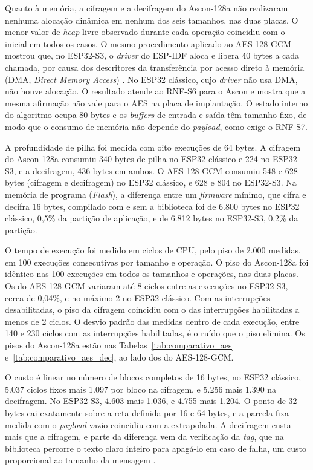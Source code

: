 Quanto à memória, a cifragem e a decifragem do Ascon-128a não realizaram nenhuma alocação dinâmica em nenhum dos seis tamanhos, nas duas placas. O menor valor de \textit{heap} livre observado durante cada operação coincidiu com o inicial em todos os casos. O mesmo procedimento aplicado ao AES-128-GCM mostrou que, no ESP32-S3, o \textit{driver} do ESP-IDF aloca e libera 40 bytes a cada chamada, por causa dos descritores da transferência por acesso direto à memória (DMA, \textit{Direct Memory Access}) \cite{espressif2026idf}. No ESP32 clássico, cujo \textit{driver} não usa DMA, não houve alocação. O resultado atende ao RNF-S6 para o Ascon e mostra que a mesma afirmação não vale para o AES na placa de implantação. O estado interno do algoritmo ocupa 80 bytes e os \textit{buffers} de entrada e saída têm tamanho fixo, de modo que o consumo de memória não depende do \textit{payload}, como exige o RNF-S7.

A profundidade de pilha foi medida com oito execuções de 64 bytes. A cifragem do Ascon-128a consumiu 340 bytes de pilha no ESP32 clássico e 224 no ESP32-S3, e a decifragem, 436 bytes em ambos. O AES-128-GCM consumiu 548 e 628 bytes (cifragem e decifragem) no ESP32 clássico, e 628 e 804 no ESP32-S3. Na memória de programa (\textit{Flash}), a diferença entre um \textit{firmware} mínimo, que cifra e decifra 16 bytes, compilado com e sem a biblioteca foi de 6.800 bytes no ESP32 clássico, 0,5\% da partição de aplicação, e de 6.812 bytes no ESP32-S3, 0,2\% da partição.

O tempo de execução foi medido em ciclos de CPU, pelo piso de 2.000 medidas, em 100 execuções consecutivas por tamanho e operação. O piso do Ascon-128a foi idêntico nas 100 execuções em todos os tamanhos e operações, nas duas placas. Os do AES-128-GCM variaram até 8 ciclos entre as execuções no ESP32-S3, cerca de 0,04\%, e no máximo 2 no ESP32 clássico. Com as interrupções desabilitadas, o piso da cifragem coincidiu com o das interrupções habilitadas a menos de 2 ciclos. O desvio padrão das medidas dentro de cada execução, entre 140 e 230 ciclos com as interrupções habilitadas, é o ruído que o piso elimina. Os pisos do Ascon-128a estão nas Tabelas~\ref{tab:comparativo_aes} e~\ref{tab:comparativo_aes_dec}, ao lado dos do AES-128-GCM.

O custo é linear no número de blocos completos de 16 bytes, no ESP32 clássico, 5.037 ciclos fixos mais 1.097 por bloco na cifragem, e 5.256 mais 1.390 na decifragem. No ESP32-S3, 4.603 mais 1.036, e 4.755 mais 1.204. O ponto de 32 bytes cai exatamente sobre a reta definida por 16 e 64 bytes, e a parcela fixa medida com o \textit{payload} vazio coincidiu com a extrapolada. A decifragem custa mais que a cifragem, e parte da diferença vem da verificação da \textit{tag}, que na biblioteca percorre o texto claro inteiro para apagá-lo em caso de falha, um custo proporcional ao tamanho da mensagem \cite{weatherley2023ascon}.

